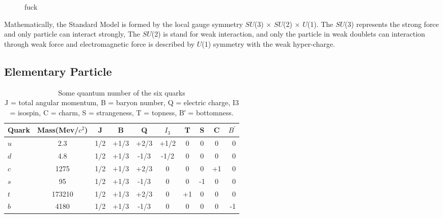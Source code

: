 \begin{figure}[h]
		\centering
		\label{SM}	
		\caption{fuck}

\end{figure}

Mathematically, the Standard Model is formed by the local gauge symmetry $SU$(3) $\times$ $SU$(2) $\times$ $U$(1). The $SU$(3) represents the strong force and only particle can interact strongly, The $SU$(2) is stand for weak interaction, and only the particle in weak doublets can interaction through weak force and electromagnetic force is described by $U$(1) symmetry with the weak hyper-charge.


\subsection{Elementary Particle}
\begin{table}[h]
\begin{center}
\begin{tabular}{l|c|c|c|c|c|c|c|c|r}
\hline
\hline
			Quark   &  Mass(Mev/$c^2$)   	&   J     &    B      &   Q    &    $I_3$   &   T      &   S    &   C   &	$B^{'}$   \\
\hline
			  $u$      & 2.3    	&   1/2     &  +1/3        &   +2/3    &   +1/2    &    0     &   0    &   0   &0	   \\
\hline
			  $d$     &  4.8   	&     1/2    &     +1/3      &   -1/3    &    -1/2   &    0     &   0    &   0   &	0   \\
\hline
			 $c$      &   1275  	&    1/2     &    +1/3       &   +2/3    &   0    &    0     &  0     &  +1    &0	   \\
\hline
			 $s$		&  95   	&   1/2      &    +1/3       &   -1/3    &   0    &    0     &   -1    &    0  &0	   \\
\hline
			 $t$		&   173210  	&   1/2      &   +1/3        &   +2/3    &  0     &   +1      &   0    &  0    &0	   \\		
\hline
			 $b$		&  4180   	&   1/2      &     +1/3      &   -1/3    &  0     &     0    &   0    &  0    &	-1   \\		
\hline
\hline						        
\end{tabular}
\caption{ Some quantum number of the six quarks\\J = total angular momentum, B = baryon number, Q = electric charge, I3 = isospin, C = charm, S = strangeness, T = topness, B′ = bottomness.} \label{t:quarka}
\end{center}
\end{table}

